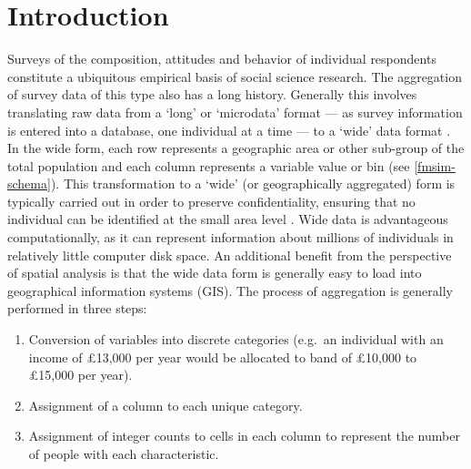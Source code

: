 \documentclass[a4paper,10pt]{article}
\begin{document}
\section{Introduction}
Surveys of the composition, attitudes and behavior of individual
respondents constitute a ubiquitous empirical basis of social science research.
The aggregation of survey data of this type also has a long history.
Generally this involves translating raw data from a `long' or `microdata' format
--- as survey information is entered into a database,
one individual at a time ---
to a `wide' data format \citep{van2012flexible}. In the wide form,
each row represents a geographic area or other sub-group of
the total population and each column represents a
variable value or bin (see \cref{fmsim-schema}). This transformation to a
`wide' (or geographically aggregated) form
 is typically carried out in order to preserve confidentiality,
ensuring that no individual can be identified at the small
area level \citep{marsh1993}. Wide data
is advantageous computationally, as it can represent information about millions of individuals
in relatively little computer disk space. An additional benefit from the
perspective of spatial analysis is that the wide data form is
generally easy to load into geographical information systems (GIS).
The process of aggregation is generally performed in three steps:  %
\begin{enumerate}
 \item Conversion of
variables into discrete categories (e.g.~an individual with an income of £13,000 per year
would be allocated to band of £10,000 to £15,000 per year).
 \item Assignment of a column to each unique category.
 \item Assignment of
integer counts to cells in each column to represent the number of people with each characteristic.
\end{enumerate}
\end{document}
